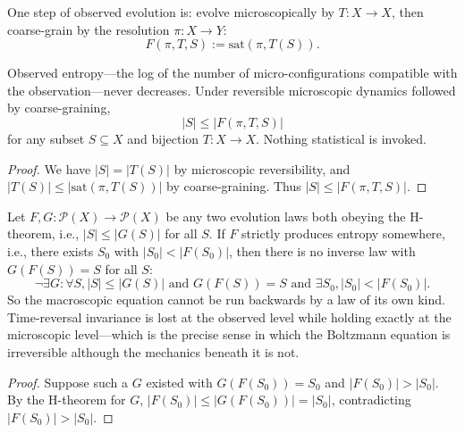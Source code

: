 \begin{definition}
One step of observed evolution is: evolve microscopically by $T : X \to X$, then coarse-grain by the resolution $\pi : X \to Y$:
\begin{equation}
F(\pi, T, S) := \text{sat}(\pi, T(S)) .
\end{equation}
\end{definition}

\begin{theorem}[H-theorem]
Observed entropy—the log of the number of micro-configurations compatible with the observation—never decreases. Under reversible microscopic dynamics followed by coarse-graining,
\begin{equation}
|S| \leq |F(\pi, T, S)|
\end{equation}
for any subset $S \subseteq X$ and bijection $T : X \to X$. Nothing statistical is invoked.
\end{theorem}

\begin{proof}
We have $|S| = |T(S)|$ by microscopic reversibility, and $|T(S)| \leq |\text{sat}(\pi, T(S))|$ by coarse-graining. Thus $|S| \leq |F(\pi, T, S)|$.
\end{proof}

\begin{theorem}
Let $F, G : \mathcal{P}(X) \to \mathcal{P}(X)$ be any two evolution laws both obeying the H-theorem, i.e., $|S| \leq |G(S)|$ for all $S$. If $F$ strictly produces entropy somewhere, i.e., there exists $S_0$ with $|S_0| < |F(S_0)|$, then there is no inverse law with $G(F(S)) = S$ for all $S$:
\begin{equation}
\neg \exists G : \forall S, |S| \leq |G(S)| \text{ and } G(F(S)) = S \text{ and } \exists S_0, |S_0| < |F(S_0)| .
\end{equation}
So the macroscopic equation cannot be run backwards by a law of its own kind. Time-reversal invariance is lost at the observed level while holding exactly at the microscopic level—which is the precise sense in which the Boltzmann equation is irreversible although the mechanics beneath it is not.
\end{theorem}

\begin{proof}
Suppose such a $G$ existed with $G(F(S_0)) = S_0$ and $|F(S_0)| > |S_0|$. By the H-theorem for $G$, $|F(S_0)| \leq |G(F(S_0))| = |S_0|$, contradicting $|F(S_0)| > |S_0|$.
\end{proof}

